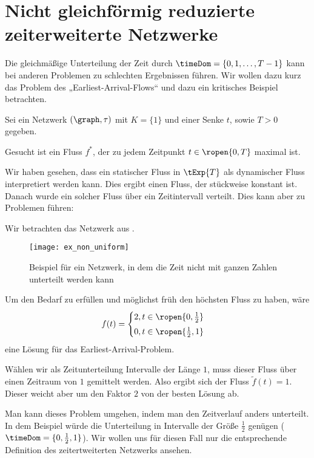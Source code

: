 \section{Nicht gleichförmig reduzierte zeiterweiterte Netzwerke}\label{sec:nonunif_cond}
Die gleichmäßige Unterteilung der Zeit durch $\timeDom = \{0,1, \ldots, T-1\}$ kann bei
anderen Problemen zu schlechten Ergebnissen führen. Wir wollen dazu kurz das Problem
des „Earliest-Arrival-Flows“ und dazu ein kritisches Beispiel betrachten.

\begin{problem}
\label{prob:qtp_single}
    Sei ein Netzwerk $(\graph, \tau)$ mit $K=\{1\}$ und einer Senke $t$, sowie
    $T > 0$ gegeben.

    Gesucht ist ein Fluss $f^*$, der zu jedem Zeitpunkt $t \in \ropen{0,T}$
    maximal ist.
\end{problem}

Wir haben gesehen, dass ein statischer Fluss in $\tExp{T}$ als dynamischer Fluss
interpretiert werden kann. Dies ergibt einen Fluss, der stückweise konstant ist.
Danach wurde ein solcher Fluss über ein Zeitintervall verteilt. Dies kann
aber zu Problemen führen:

\begin{example}
    Wir betrachten das Netzwerk aus .
    \begin{figure}[H]
    \centering
    \texttt{[image: ex\_non\_uniform]}
    \caption{Beispiel für ein Netzwerk, in dem die Zeit nicht mit ganzen
                Zahlen unterteilt werden kann}
    \label{fig:ex_non_uniform}
    \end{figure}
    Um den Bedarf zu erfüllen und möglichst früh den höchsten Fluss
    zu haben, wäre
    \[
        f(t) = \begin{cases}
            2, t \in \ropen{0,\frac{1}{2}} \vspace{3pt} \\
            0, t \in \ropen{\frac{1}{2}, 1}
        \end{cases}
    \]
    eine Lösung für das Earliest-Arrival-Problem.

    Wählen wir als Zeitunterteilung Intervalle der Länge $1$, muss dieser Fluss
    über einen Zeitraum von $1$ gemittelt werden. Also ergibt sich der Fluss
    $\widetilde{f}(t) = 1$. Dieser weicht aber um den Faktor $2$ von der
    besten Lösung ab.
\end{example}

Man kann dieses Problem umgehen, indem man den Zeitverlauf anders unterteilt. In dem
Beispiel würde die Unterteilung in Intervalle der Größe $\frac{1}{2}$
genügen ($\timeDom = \{0, \frac{1}{2}, 1\}$). Wir wollen uns für diesen Fall nur
die entsprechende Definition des zeitertweiterten Netzwerks ansehen.

